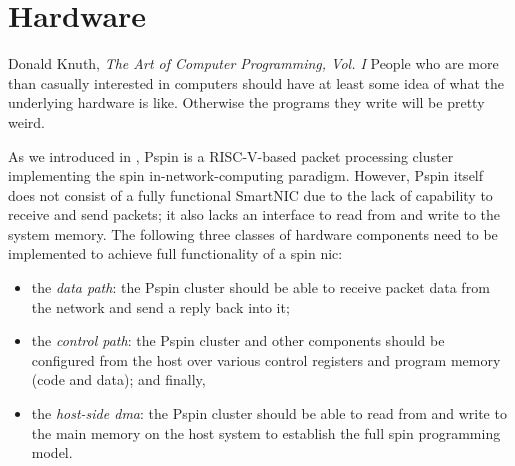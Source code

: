 \chapter{Hardware} \label{chap:hardware}
\begin{chapquote}{Donald Knuth, \textit{The Art of Computer Programming, Vol. I}}
People who are more than casually interested in computers should have at least some idea of what the underlying hardware is like. Otherwise the programs they write will be pretty weird.
\end{chapquote}


As we introduced in , P\acs{spin} is a RISC-V-based packet processing cluster implementing the \ac{spin} in-network-computing paradigm.  However, P\acs{spin} itself does not consist of a fully functional SmartNIC due to the lack of capability to receive and send packets; it also lacks an interface to read from and write to the system memory.  The following three classes of hardware components need to be implemented to achieve full functionality of a \ac{spin} \ac{nic}:

\begin{itemize}
    \item the \emph{data path}: the P\acs{spin} cluster should be able to receive packet data from the network and send a reply back into it;
    \item the \emph{control path}: the P\acs{spin} cluster and other components should be configured from the host over various control registers and program memory (code and data); and finally,
    \item the \emph{host-side \ac{dma}}: the P\acs{spin} cluster should be able to read from and write to the main memory on the host system to establish the full \ac{spin} programming model.
\end{itemize}

